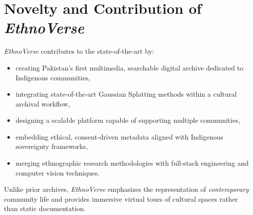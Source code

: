 \section{Novelty and Contribution of \textit{EthnoVerse}}

\textit{EthnoVerse} contributes to the state-of-the-art by:

\begin{itemize}
    \item creating Pakistan's first multimedia, searchable digital archive dedicated 
    to Indigenous communities,
    \item integrating state-of-the-art Gaussian Splatting methods within a 
    cultural archival workflow,
    \item designing a scalable platform capable of supporting multiple 
    communities,
    \item embedding ethical, consent-driven metadata aligned with Indigenous 
    sovereignty frameworks,
    \item merging ethnographic research methodologies with full-stack engineering and 
    computer vision techniques.
\end{itemize}

Unlike prior archives, \textit{EthnoVerse} emphasizes the representation of 
\textit{contemporary} community life and provides immersive virtual tours of cultural 
spaces rather than static documentation.